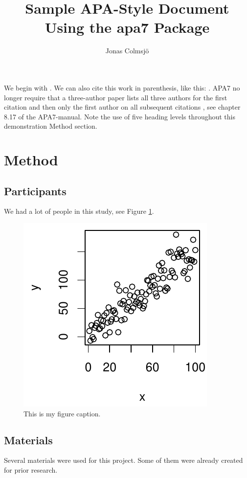 \documentclass[stu,floatsintext]{apa7}
\title{Sample APA-Style Document Using the \textsf{apa7} Package}
\author{Jonas Colmsjö}
\affiliation{Gothenburg University, Department of Psychology}
\begin{document}
\maketitle

We begin with \textcite{thaler_nudge_2008}.  We can also cite this work in
parenthesis, like this: \parencite{thaler_nudge_2008}.
APA7 no longer require that a three-author paper \parencite[e.g.,][]{anicich_hierarchical_2015}
lists all three authors for the first citation and then only the first author
on all subsequent citations \parencite{anicich_hierarchical_2015}, see chapter
8.17 of the APA7-manual.
Note the use of five heading levels throughout this demonstration
Method section.

\section{Method}
\subsection{Participants}
We had a lot of people in this study, see Figure \ref{fig:Figure1}.

\begin{figure}[h]
  \caption{ This is my figure caption.}
    \label{fig:Figure1}
  \includegraphics{./Figure1.pdf}
\end{figure}

\subsection{Materials}
Several materials were used for this project.  Some of them were
already created for prior research.
\end{document}
